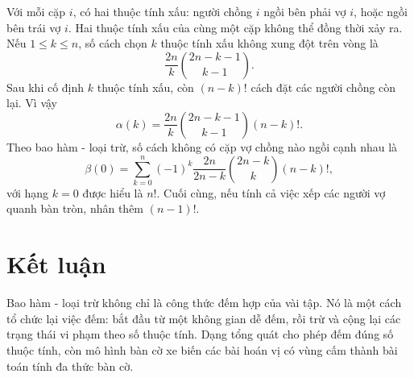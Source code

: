 \documentclass[11pt]{article}
\newcommand{\C}[2]{\binom{#1}{#2}}
\begin{document}
Với mỗi cặp \(i\), có hai thuộc tính xấu: người chồng \(i\) ngồi bên phải vợ
\(i\), hoặc ngồi bên trái vợ \(i\). Hai thuộc tính xấu của cùng một cặp không
thể đồng thời xảy ra. Nếu \(1\le k\le n\), số cách chọn \(k\) thuộc tính xấu
không xung đột trên vòng là
\[
  \frac{2n}{k}\C{2n-k-1}{k-1}.
\]
Sau khi cố định \(k\) thuộc tính xấu, còn \((n-k)!\) cách đặt các người chồng
còn lại. Vì vậy
\[
  \alpha(k)=\frac{2n}{k}\C{2n-k-1}{k-1}(n-k)!.
\]
Theo bao hàm - loại trừ, số cách không có cặp vợ chồng nào ngồi cạnh nhau là
\[
  \beta(0)=
  \sum_{k=0}^{n}
  (-1)^k\frac{2n}{2n-k}\C{2n-k}{k}(n-k)!,
\]
với hạng \(k=0\) được hiểu là \(n!\). Cuối cùng, nếu tính cả việc xếp các
người vợ quanh bàn tròn, nhân thêm \((n-1)!\).

\section*{Kết luận}

Bao hàm - loại trừ không chỉ là công thức đếm hợp của vài tập. Nó là một cách
tổ chức lại việc đếm: bắt đầu từ một không gian dễ đếm, rồi trừ và cộng lại
các trạng thái vi phạm theo số thuộc tính. Dạng tổng quát cho phép đếm đúng số
thuộc tính, còn mô hình bàn cờ xe biến các bài hoán vị có vùng cấm thành bài
toán tính đa thức bàn cờ.
\end{document}
